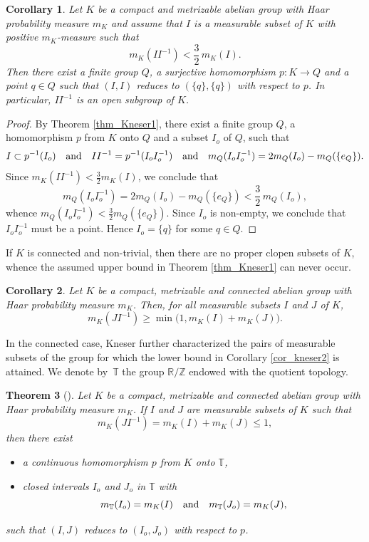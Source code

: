 \documentclass[10pt]{amsart}
\newcommand{\bR}{\mathbb{R}}
\newcommand{\bT}{\mathbb{T}}
\newcommand{\bZ}{\mathbb{Z}}
\newcommand{\qand}{\quad\textup{and}\quad}
\theoremstyle{plain}
\newtheorem{theorem}{Theorem}[section]
\newtheorem{corollary}[theorem]{Corollary}
\theoremstyle{definition}
\begin{document}
\begin{corollary}
\label{cor_kneser1}
Let $K$ be a compact and metrizable abelian group with Haar probability measure $m_K$ and assume that $I$ is a measurable
subset of $K$ with positive $m_K$-measure such that
\[
m_K(II^{-1}) < \frac{3}{2}\, m_K(I).
\]
Then there exist a finite group $Q$, a surjective homomorphism $p : K \to Q$ and a point $q \in Q$ such that $(I,I)$ reduces
to $(\{q\},\{q\})$ with respect to $p$. In particular, $II^{-1}$ is an open subgroup of $K$.
\end{corollary}

\begin{proof}
By Theorem \ref{thm_Kneser1}, there exist a finite group $Q$, a homomorphism $p$ from $K$ onto $Q$ and
a subset $I_o$ of $Q$, such that
\[
I \subset p^{-1}(I_o) \qand II^{-1} = p^{-1}(I_o I_o^{-1}) \qand m_Q(I_o I_o^{-1}) = 2m_Q(I_o) - m_Q(\{e_Q\}).
\]
Since $m_K(II^{-1}) < \frac{3}{2} m_K(I)$, we conclude that
\begin{equation}
\label{Qbnd}
m_Q(I_o I_o^{-1}) = 2m_Q(I_o) - m_Q(\{e_Q\}) < \frac{3}{2}\, m_Q(I_o),
\end{equation}
whence $m_Q(I_o I_o^{-1}) < \frac{3}{2} m_Q(\{e_Q\})$. Since $I_o$ is non-empty, we conclude that $I_o I_o^{-1}$ must be a
point. Hence $I_o = \{q\}$ for some $q \in Q$.
\end{proof}

If $K$ is connected and non-trivial, then there are no proper clopen subsets of $K$, whence the assumed upper bound in Theorem \ref{thm_Kneser1}
can never occur.

\begin{corollary}
\label{cor_kneser2}
Let $K$ be a compact, metrizable and connected abelian group with Haar probability measure $m_K$. Then, for all measurable subsets
$I$ and $J$ of $K$,
\[
m_K(JI^{-1}) \geq \min\bigl(1,m_K(I) + m_K(J)\bigr).
\]
\end{corollary}

In the connected case, Kneser further characterized the pairs of measurable subsets of the group for which the lower bound in Corollary \eqref{cor_kneser2}
is attained. We denote by~$\bT$ the group $\bR/\bZ$ endowed with the quotient topology.

\begin{theorem}[{\cite[Satz\,2]{Kneser}}]
\label{thm_Kneser2}
Let $K$ be a compact, metrizable and connected abelian group with Haar probability measure $m_K$. If $I$ and $J$ are measurable
subsets of $K$ such that
\[
m_K(JI^{-1}) = m_K(I) + m_K(J) \leq 1,
\]
then there exist

\begin{itemize}
\item a continuous homomorphism $p$ from $K$ onto $\bT$,
\item closed intervals $I_o$ and $J_o$ in $\bT$ with
\[
m_\bT(I_o) = m_K(I) \qand m_{\bT}(J_o) = m_{K}(J),
\]
\end{itemize}
such that $(I,J)$ reduces to $(I_o,J_o)$ with respect to $p$.
\end{theorem}
\end{document}
